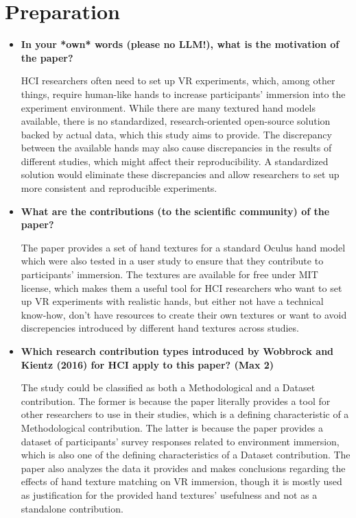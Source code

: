 \section {Preparation}

\begin{itemize}
\item {
    \textbf{In your *own* words (please no LLM!), what is the motivation of the paper?}

    HCI researchers often need to set up VR experiments, which, among other things, require human-like hands to increase participants' immersion into the experiment environment. While there are many textured hand models available, there is no standardized, research-oriented open-source solution backed by actual data, which this study \cite{Pohl2022Hands} aims to provide. The discrepancy between the available hands may also cause discrepancies in the results of different studies, which might affect their reproducibility. A standardized solution would eliminate these discrepancies and allow researchers to set up more consistent and reproducible experiments.
}

\item {
    \textbf{What are the contributions (to the scientific community) of the paper?}

    The paper provides a set of hand textures for a standard Oculus hand model which were also tested in a user study to ensure that they contribute to participants' immersion. The textures are available for free under MIT license, which makes them a useful tool for HCI researchers who want to set up VR experiments with realistic hands, but either not have a technical know-how, don't have resources to create their own textures or want to avoid discrepencies introduced by different hand textures across studies.
}

\item {
    \textbf{Which research contribution types introduced by Wobbrock and Kientz (2016) for HCI apply to this paper? (Max 2)}

    The study could be classified as both a Methodological and a Dataset contribution. The former is because the paper literally provides a tool for other researchers to use in their studies, which is a defining characteristic of a Methodological contribution. The latter is because the paper provides a dataset of participants' survey responses related to environment immersion, which is also one of the defining characteristics of a Dataset contribution. The paper also analyzes the data it provides and makes conclusions regarding the effects of hand texture matching on VR immersion, though it is mostly used as justification for the provided hand textures' usefulness and not as a standalone contribution.
}
\end{itemize}
